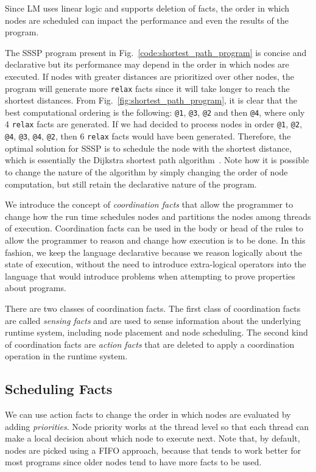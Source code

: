 Since LM uses linear logic and supports deletion of facts, the order in which
nodes are scheduled can impact the performance and even the results of the
program.

The SSSP program present in Fig.~\ref{code:shortest_path_program} is concise and
declarative but its performance may depend in the order in which nodes are
executed. If nodes with greater distances are prioritized over other nodes, the
program will generate more \texttt{relax} facts since it will take longer to
reach the shortest distances. From Fig.~\ref{fig:shortest_path_program}, it is
clear that the best computational ordering is the following: \texttt{@1},
\texttt{@3}, \texttt{@2} and then \texttt{@4}, where only 4 \texttt{relax}
facts are generated. If we had decided to process nodes in order
\texttt{@1}, \texttt{@2}, \texttt{@4}, \texttt{@3}, \texttt{@4},
\texttt{@2}, then 6 \texttt{relax} facts would have been generated.
Therefore, the optimal solution for SSSP is to schedule the node with the
shortest distance, which is essentially the Dijkstra shortest path
algorithm~\cite{Dijkstra}. Note how it is possible to change the nature of
the algorithm by simply changing the order of node computation, but still
retain the declarative nature of the program.

We introduce the concept of \emph{coordination facts} that allow the programmer
to change how the run time schedules nodes and partitions the nodes among
threads of execution. Coordination facts can be used in the body or head of the
rules to allow the programmer to reason and change how execution is to be done.
In this fashion, we keep the language declarative because we reason logically
about the state of execution, without the need to introduce extra-logical
operators into the language that would introduce problems when attempting to prove
properties about programs.

There are two classes of coordination facts. The first class of coordination facts are
called \emph{sensing facts} and are used to sense information about the
underlying runtime system, including node placement and node scheduling.
The second kind of coordination facts are \emph{action facts} that are deleted
to apply a coordination operation in the runtime system.

\subsection{Scheduling Facts}\label{sec:fifo}

We can use action facts to change the order in which nodes are evaluated by adding
\emph{priorities}. Node priority works at the thread level
so that each thread can make a local decision about which node to execute next.
Note that, by default, nodes are picked using a FIFO approach, because that
tends to work better for most programs since older nodes tend to have more facts
to be used.

